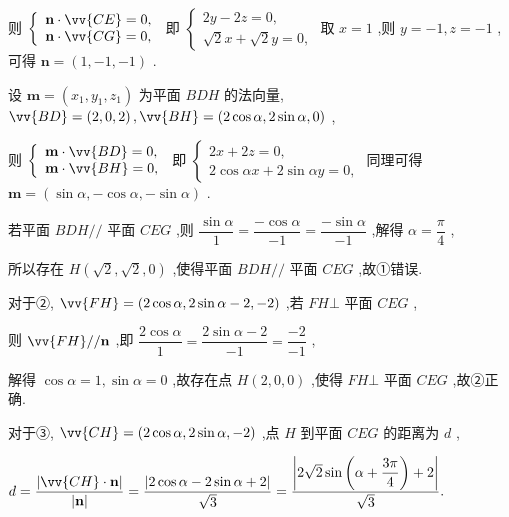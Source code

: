 则 $\left\{  \begin{array}{l} \mathbf{n} \cdot  \vv{CE} = 0, \\  \mathbf{n} \cdot  \vv{CG} = 0, \end{array}\right.$ 即 $\left\{  \begin{array}{l} {2y} - {2z} = 0, \\  \sqrt{2}x + \sqrt{2}y = 0, \end{array}\right.$ 取 $x = 1$ ,则 $y =  - 1,z =  - 1$ ,可得 $\mathbf{n} = \left( {1, - 1, - 1}\right)$ .

设 $\mathbf{m} = \left( {{x}_{1},{y}_{1},{z}_{1}}\right)$ 为平面 ${BDH}$ 的法向量, $\vv{BD} = \left( {2,0,2}\right) ,\vv{BH} = \left( {2\cos \alpha ,2\sin \alpha ,0}\right)$ ,

则 $\left\{  \begin{array}{l} \mathbf{m} \cdot  \vv{BD} = 0, \\  \mathbf{m} \cdot  \vv{BH} = 0, \end{array}\right.$ 即 $\left\{  \begin{array}{l} {2x} + {2z} = 0, \\  2\cos {\alpha x} + 2\sin {\alpha y} = 0, \end{array}\right.$ 同理可得 $\mathbf{m} = \left( {\sin \alpha , - \cos \alpha , - \sin \alpha }\right)$ .

若平面 ${BDH}//$ 平面 ${CEG}$ ,则 $\dfrac{\sin \alpha }{1} = \dfrac{-\cos \alpha }{-1} = \dfrac{-\sin \alpha }{-1}$ ,解得 $\alpha  = \dfrac{\pi }{4}$ ,

所以存在 $H\left( {\sqrt{2},\sqrt{2},0}\right)$ ,使得平面 ${BDH}//$ 平面 ${CEG}$ ,故①错误.

对于②, $\vv{FH} = \left( {2\cos \alpha ,2\sin \alpha  - 2, - 2}\right)$ ,若 ${FH} \bot$ 平面 ${CEG}$ ,

则 $\vv{FH}//\mathbf{n}$ ,即 $\dfrac{2\cos \alpha }{1} = \dfrac{2\sin \alpha  - 2}{-1} = \dfrac{-2}{-1}$ ,

解得 $\cos \alpha  = 1,\sin \alpha  = 0$ ,故存在点 $H\left( {2,0,0}\right)$ ,使得 ${FH} \bot$ 平面 ${CEG}$ ,故②正确.

对于③, $\vv{CH} = \left( {2\cos \alpha ,2\sin \alpha , - 2}\right)$ ,点 $H$ 到平面 ${CEG}$ 的距离为 $d$ ,

$d = \dfrac{\left| \vv{CH} \cdot  \mathbf{n}\right| }{\left| \mathbf{n}\right| } = \dfrac{\left| 2\cos \alpha  - 2\sin \alpha  + 2\right| }{\sqrt{3}} = \dfrac{\left| 2\sqrt{2}\sin \left( \alpha  + \dfrac{3\pi }{4}\right)  + 2\right| }{\sqrt{3}}.$

